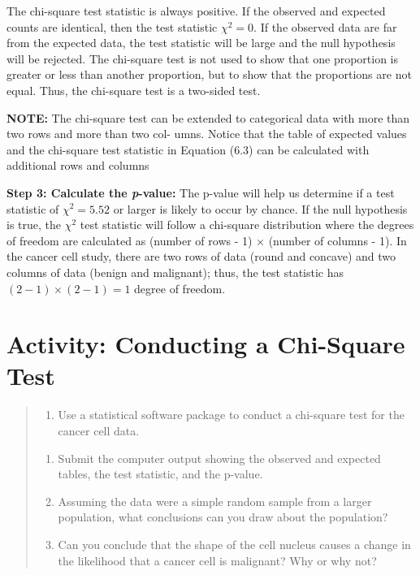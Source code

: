 \documentclass[
]{report}
\providecommand{\tightlist}{%
  \setlength{\itemsep}{0pt}\setlength{\parskip}{0pt}}
\begin{document}
The chi-square test statistic is always positive. If the observed and expected counts are identical, then
the test statistic \(\chi^2 = 0\). If the observed data are far from the expected data, the test statistic will be large
and the null hypothesis will be rejected. The chi-square test is not used to show that one proportion is greater
or less than another proportion, but to show that the proportions are not equal. Thus, the chi-square test is a
two-sided test.

\large

\textbf{NOTE:}
The chi-square test can be extended to categorical data with more than two rows and more than two col-
umns. Notice that the table of expected values and the chi-square test statistic in Equation (6.3) can be
calculated with additional rows and columns
\normalsize

\textbf{Step 3: Calculate the \emph{p}-value:}
The p-value will help us determine if a test statistic of \(\chi^2 = 5.52\) or larger is likely to occur by chance. If
the null hypothesis is true, the \(\chi^2\) test statistic will follow a chi-square distribution where the degrees of
freedom are calculated as (number of rows - 1) \(\times\) (number of columns - 1). In the cancer cell study,
there are two rows of data (round and concave) and two columns of data (benign and malignant); thus,
the test statistic has \((2- 1) \times (2- 1) = 1\) degree of freedom.

\section*{Activity: Conducting a Chi-Square Test}\label{activity-conducting-a-chi-square-test}

\begin{quote}
\begin{enumerate}
\def\labelenumi{\arabic{enumi}.}
\setcounter{enumi}{18}
\tightlist
\item
  Use a statistical software package to conduct a chi-square test for the cancer cell data.
\end{enumerate}

\begin{enumerate}
\def\labelenumi{\alph{enumi}.}
\tightlist
\item
  Submit the computer output showing the observed and expected tables, the test statistic, and the
  p-value.
\item
  Assuming the data were a simple random sample from a larger population, what conclusions can
  you draw about the population?
\item
  Can you conclude that the shape of the cell nucleus causes a change in the likelihood that a cancer
  cell is malignant? Why or why not?
\end{enumerate}
\end{quote}
\end{document}
